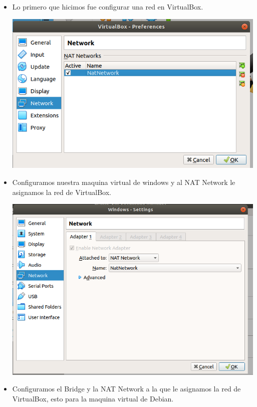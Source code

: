\documentclass[a4paper, 11pt, oneside]{article}
\begin{document}
\begin{itemize}
    \item Lo primero que hicimos fue configurar una red en VirtualBox.
    \begin{center}
    \includegraphics[scale=0.40]{1.png}    
    \end{center}
    
    \item Configuramos nuestra maquina virtual de windows y al NAT Network le asignamos la red de VirtualBox.
    
    \begin{center}
    \includegraphics[scale=0.40]{2.png}    
    \end{center}
    
    
    \item Configuramos el Bridge y la NAT Network a la que le asignamos la red de VirtualBox, esto para la maquina virtual de Debian.
    

\end{itemize}
\end{document}
